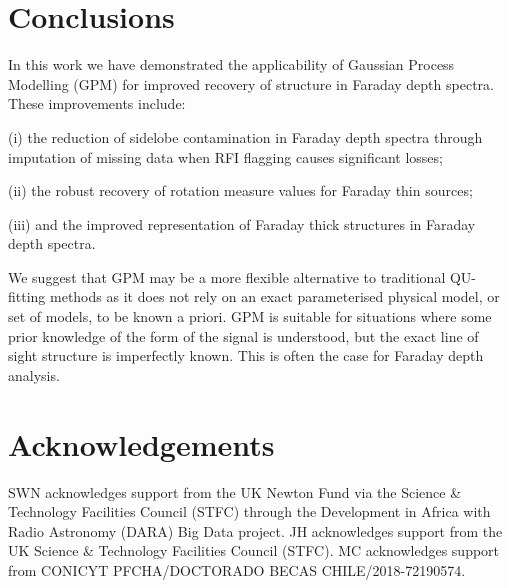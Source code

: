 \documentclass[fleqn,usenatbib]{mnras}
\begin{document}
\section{Conclusions}
\label{sec:conclusions}

In this work we have demonstrated the applicability of Gaussian Process Modelling (GPM) for improved recovery of structure in Faraday depth spectra. These improvements include:

\noindent
(i) the reduction of sidelobe contamination in Faraday depth spectra through imputation of missing data when RFI flagging causes significant losses;

\noindent
(ii) the robust recovery of rotation measure values for Faraday thin sources;

\noindent
(iii) and the improved representation of Faraday thick structures in Faraday depth spectra.

We suggest that GPM may be a more flexible alternative to traditional QU-fitting methods as it does not rely on an exact parameterised physical model, or set of models, to be known a priori. GPM is suitable for situations where some prior knowledge of the form of the signal is understood, but the exact line of sight structure is imperfectly known. This is often the case for Faraday depth analysis.

\section*{Acknowledgements}

SWN acknowledges support from the UK Newton Fund via the Science \& Technology Facilities Council (STFC) through the Development in Africa with Radio Astronomy (DARA) Big Data project. JH acknowledges support from the UK Science \& Technology Facilities Council (STFC). MC acknowledges support from CONICYT PFCHA/DOCTORADO BECAS CHILE/2018-72190574.







\end{document}

